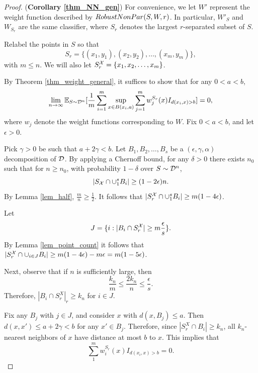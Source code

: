 \begin{proof}(\textbf{Corollary  \ref{thm_NN_gen}}) 
For convenience, we let $W'$ represent the weight function described by $RobustNonPar(S,W, r)$. In particular, $W'_S$ and $W_{S_r}$ are the same classifier, where $S_r$ denotes the largest $r$-separated subset of $S$.

Relabel the points in $S$ so that $$S_r = \{(x_1, y_1), (x_2, y_2), \dots, (x_m, y_m)\},$$ with $ m \leq n$. We will also let $S_r^\mathcal X = \{x_1, x_2, \dots, x_m\}$. 

By Theorem \ref{thm_weight_general}, it suffices to show that for any $0 < a < b$, $$\lim_{n \to \infty}\mathbb{E}_{S \sim {\mathcal D}^n} [\frac{1}{m} \sum_{i=1}^{m}\sup_{x \in B(x_i,a)} \sum_{j=1}^{m} w_j^{S_r}(x)I_{d(x_i, x) > b}] = 0,$$ where $w_j$ denote the weight functions corresponding to $W$. Fix $0 < a < b$, and let $\epsilon > 0$. 

Pick $\gamma > 0$ be such that $a+ 2\gamma < b$. Let $B_1, B_2, \dots, B_s$ be a $(\epsilon, \gamma, \alpha)$ decomposition of ${\mathcal D}$. By applying a Chernoff bound, for any $\delta > 0$ there exists $n_0$ such that for $n \geq n_0$, with probability $1-\delta$ over $S \sim {\mathcal D}^n$, $$|S_\mathcal X \cap \cup_1^s B_i| \geq (1-2\epsilon)n.$$  By Lemma \ref{lem_half}, $\frac{m}{n} \geq \frac{1}{2}$. It follows that $|S_r^\mathcal X \cap \cup_1^s B_i| \geq m(1-4\epsilon)$. 

Let $$J = \{i: |B_i \cap S_r^\mathcal X| \geq m\frac{\epsilon}{s}\}.$$ By Lemma \ref{lem_point_count} it follows that  $|S_r^\mathcal X \cap \cup_{i \in J} B_i| \geq m(1 - 4\epsilon) - m\epsilon = m(1 - 5\epsilon)$.

Next, observe that if $n$ is sufficiently large, then $$\frac{k_n}{m} \leq \frac{2k_n}{n} \leq \frac{\epsilon}{s}.$$ Therefore, $|B_i \cap S_r^X|_r \geq k_n$ for $i \in J$.

Fix any $B_j$ with $j \in J$, and consider $x$ with $d(x, B_j) \leq a$. Then $d(x, x') \leq a+ 2\gamma < b$ for any $x' \in B_j$. Therefore, since $|S_r^X \cap B_i| \geq k_n$, all $k_n$-nearest neighbors of $x$ have distance at most $b$ to $x$. This implies that $$\sum_1^m w_i^{S_r}(x)I_{d(x_i, x) > b} = 0.$$ 


\end{proof}
